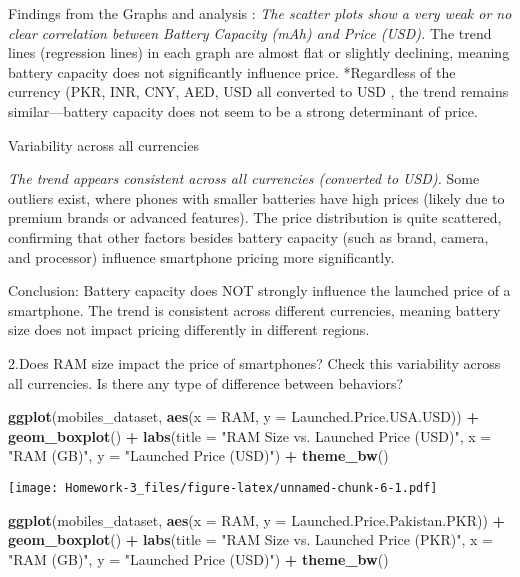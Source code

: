 \documentclass[
]{article}
\newenvironment{Shaded}{\begin{snugshade}}{\end{snugshade}}
\newcommand{\AttributeTok}[1]{\textcolor[rgb]{0.13,0.29,0.53}{#1}}
\newcommand{\FunctionTok}[1]{\textcolor[rgb]{0.13,0.29,0.53}{\textbf{#1}}}
\newcommand{\NormalTok}[1]{#1}
\newcommand{\SpecialCharTok}[1]{\textcolor[rgb]{0.81,0.36,0.00}{\textbf{#1}}}
\newcommand{\StringTok}[1]{\textcolor[rgb]{0.31,0.60,0.02}{#1}}
\begin{document}
Findings from the Graphs and analysis : \emph{The scatter plots show a
very weak or no clear correlation between Battery Capacity (mAh) and
Price (USD). }The trend lines (regression lines) in each graph are
almost flat or slightly declining, meaning battery capacity does not
significantly influence price. *Regardless of the currency (PKR, INR,
CNY, AED, USD all converted to USD , the trend remains similar---battery
capacity does not seem to be a strong determinant of price.

Variability across all currencies

\emph{The trend appears consistent across all currencies (converted to
USD). }Some outliers exist, where phones with smaller batteries have
high prices (likely due to premium brands or advanced features). The
price distribution is quite scattered, confirming that other factors
besides battery capacity (such as brand, camera, and processor)
influence smartphone pricing more significantly.

Conclusion: Battery capacity does NOT strongly influence the launched
price of a smartphone. The trend is consistent across different
currencies, meaning battery size does not impact pricing differently in
different regions.

2.Does RAM size impact the price of smartphones? Check this variability
across all currencies. Is there any type of difference between
behaviors?

\begin{Shaded}
\begin{Highlighting}[]
\FunctionTok{ggplot}\NormalTok{(mobiles\_dataset, }\FunctionTok{aes}\NormalTok{(}\AttributeTok{x =}\NormalTok{ RAM, }\AttributeTok{y =}\NormalTok{ Launched.Price.USA.USD)) }\SpecialCharTok{+}
  \FunctionTok{geom\_boxplot}\NormalTok{() }\SpecialCharTok{+}
  \FunctionTok{labs}\NormalTok{(}\AttributeTok{title =} \StringTok{"RAM Size vs. Launched Price (USD)"}\NormalTok{,}
       \AttributeTok{x =} \StringTok{"RAM (GB)"}\NormalTok{,}
       \AttributeTok{y =} \StringTok{"Launched Price (USD)"}\NormalTok{) }\SpecialCharTok{+}
  \FunctionTok{theme\_bw}\NormalTok{()}
\end{Highlighting}
\end{Shaded}

\texttt{[image: Homework-3\_files/figure-latex/unnamed-chunk-6-1.pdf]}

\begin{Shaded}
\begin{Highlighting}[]
\FunctionTok{ggplot}\NormalTok{(mobiles\_dataset, }\FunctionTok{aes}\NormalTok{(}\AttributeTok{x =}\NormalTok{ RAM, }\AttributeTok{y =}\NormalTok{ Launched.Price.Pakistan.PKR)) }\SpecialCharTok{+}
  \FunctionTok{geom\_boxplot}\NormalTok{() }\SpecialCharTok{+}
  \FunctionTok{labs}\NormalTok{(}\AttributeTok{title =} \StringTok{"RAM Size vs. Launched Price (PKR)"}\NormalTok{,}
       \AttributeTok{x =} \StringTok{"RAM (GB)"}\NormalTok{,}
       \AttributeTok{y =} \StringTok{"Launched Price (USD)"}\NormalTok{) }\SpecialCharTok{+}
  \FunctionTok{theme\_bw}\NormalTok{()}
\end{Highlighting}
\end{Shaded}
\end{document}
